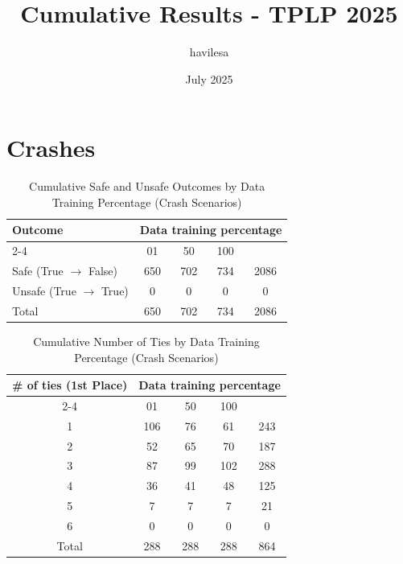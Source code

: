 \documentclass{article}
\title{Cumulative Results - TPLP 2025}
\author{havilesa}
\date{July 2025}
\begin{document}
\maketitle

\section{Crashes}
\begin{table}[h]
\centering
\caption{Cumulative Safe and Unsafe Outcomes by Data Training Percentage (Crash Scenarios)}
\begin{tabular}{l|ccc|c}
\toprule
\multirow{2}{*}{Outcome} & \multicolumn{5}{c|}{Data training percentage} & \multirow{2}{*}{Total} \\
\cmidrule{2-4}
 & 01 & 50 & 100 & \\
\midrule
Safe (True $\rightarrow$ False) & 650 & 702 & 734 & 2086 \\ 
Unsafe (True $\rightarrow$ True) & 0 & 0 & 0 & 0 \\ 
\midrule
Total & 650 & 702 & 734 & 2086 \\ 
\bottomrule
\end{tabular}
\end{table}

\begin{table}[h]
\centering
\caption{Cumulative Number of Ties by Data Training Percentage (Crash Scenarios)}
\begin{tabular}{c|ccc|c}
\toprule
\multirow{2}{*}{\# of ties (1st Place)} & \multicolumn{5}{c|}{Data training percentage} & \multirow{2}{*}{Total} \\
\cmidrule{2-4}
 & 01 & 50  & 100 & \\
\midrule
1 & 106 & 76 & 61 & 243 \\ 
2 & 52 & 65 & 70 & 187 \\ 
3 & 87 & 99 & 102 & 288 \\ 
4 & 36 & 41 & 48 & 125 \\ 
5 & 7 & 7 & 7 & 21 \\ 
6 & 0 & 0 & 0 & 0 \\ 
\midrule
Total & 288 & 288 & 288 & 864 \\ 
\bottomrule
\end{tabular}
\end{table}
\end{document}

